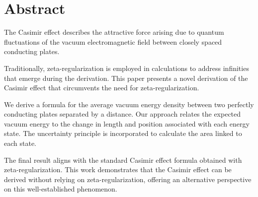 \section{Abstract}
\par
The Casimir effect describes the attractive force arising due to quantum fluctuations of the vacuum electromagnetic field 
between closely spaced conducting plates. 

Traditionally, zeta-regularization is employed in calculations to address infinities that emerge during the derivation. 
This paper presents a novel derivation of the Casimir effect that circumvents the need for zeta-regularization.

We derive a formula for the average vacuum energy density between two perfectly conducting plates separated by a distance. 
Our approach relates the expected vacuum energy to the change in length and position associated with each energy state. 
The uncertainty principle is incorporated to calculate the area linked to each state. 

The final result aligns with the standard Casimir effect formula obtained with zeta-regularization. 
This work demonstrates that the Casimir effect can be derived without relying on zeta-regularization, 
offering an alternative perspective on this well-established phenomenon.
